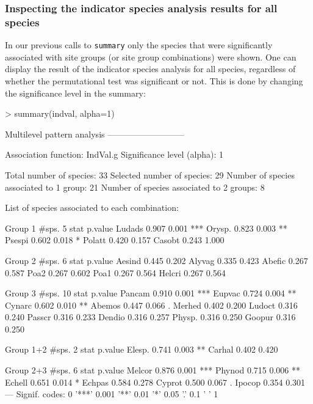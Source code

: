 \documentclass[11pt,a4paper]{article}
\begin{document}
\subsubsection{Inspecting the indicator species analysis results for all species}
In our previous calls to \texttt{summary} only the species that were significantly associated with site groups (or site group combinations) were shown. One can display the result of the indicator species analysis for all species, regardless of whether the permutational test was significant or not. This is done by changing the significance level in the summary:
\begin{Schunk}
\begin{Sinput}
> summary(indval, alpha=1)
\end{Sinput}
\begin{Soutput}
 Multilevel pattern analysis
 ---------------------------

 Association function: IndVal.g
 Significance level (alpha): 1

 Total number of species: 33
 Selected number of species: 29 
 Number of species associated to 1 group: 21 
 Number of species associated to 2 groups: 8 

 List of species associated to each combination: 

 Group 1  #sps.  5 
        stat p.value    
Ludads 0.907   0.001 ***
Orysp. 0.823   0.003 ** 
Psespi 0.602   0.018 *  
Polatt 0.420   0.157    
Casobt 0.243   1.000    

 Group 2  #sps.  6 
        stat p.value
Aesind 0.445   0.202
Alyvag 0.335   0.423
Abefic 0.267   0.587
Poa2   0.267   0.602
Poa1   0.267   0.564
Helcri 0.267   0.564

 Group 3  #sps.  10 
        stat p.value    
Pancam 0.910   0.001 ***
Eupvac 0.724   0.004 ** 
Cynarc 0.602   0.010 ** 
Abemos 0.447   0.066 .  
Merhed 0.402   0.200    
Ludoct 0.316   0.240    
Passcr 0.316   0.233    
Dendio 0.316   0.257    
Physp. 0.316   0.250    
Goopur 0.316   0.250    

 Group 1+2  #sps.  2 
        stat p.value   
Elesp. 0.741   0.003 **
Carhal 0.402   0.420   

 Group 2+3  #sps.  6 
        stat p.value    
Melcor 0.876   0.001 ***
Phynod 0.715   0.006 ** 
Echell 0.651   0.014 *  
Echpas 0.584   0.278    
Cyprot 0.500   0.067 .  
Ipocop 0.354   0.301    
---
Signif. codes:  0 '***' 0.001 '**' 0.01 '*' 0.05 '.' 0.1 ' ' 1 
\end{Soutput}
\end{Schunk}
\end{document}
